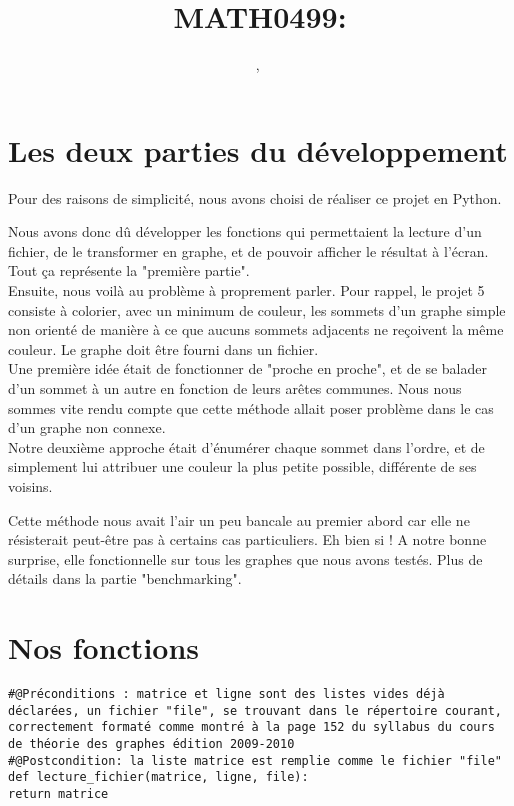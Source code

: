 \documentclass[a4paper, 11pt, oneside]{article}
\title{MATH0499: \intitule}
\author{ \PrenomUN~\textsc{\NomUN}, \PrenomDEUX~\textsc{\NomDEUX}}
\date{}
\newcommand{\tablemat}{~}
\renewcommand{\tablemat}{\tableofcontents}
\begin{document}
\maketitle
\newpage
\tablemat
\newpage



\section{Les deux parties du développement}

Pour des raisons de simplicité, nous avons choisi de réaliser ce projet en Python.

Nous avons donc dû développer les fonctions qui permettaient la lecture d'un fichier, de le transformer en graphe, et de pouvoir afficher le résultat à l'écran. Tout ça représente la "première partie".
\\
Ensuite, nous voilà au problème à proprement parler.
Pour rappel, le projet 5 consiste à  colorier, avec un minimum de couleur, les sommets d'un graphe simple non orienté de manière à ce que aucuns sommets adjacents ne reçoivent la même couleur. Le graphe doit être fourni dans un fichier.
\\


Une première idée était de fonctionner de "proche en proche", et de se balader d'un sommet à un autre en fonction de leurs arêtes communes.
Nous nous sommes vite rendu compte que cette méthode allait poser problème dans le cas d'un graphe non connexe.
\\

Notre deuxième approche était d'énumérer chaque sommet dans l'ordre, et de simplement lui attribuer une couleur la plus petite possible, différente de ses voisins.


Cette méthode nous avait l'air un peu bancale au premier abord car elle ne résisterait peut-être pas à certains cas particuliers.
Eh bien si ! A notre bonne surprise, elle fonctionnelle sur tous les graphes que nous avons testés. Plus de détails dans la partie "benchmarking".




\section{Nos fonctions}



\begin{lstlisting}[caption={lecture du fichier}]
#@Préconditions : matrice et ligne sont des listes vides déjà déclarées, un fichier "file", se trouvant dans le répertoire courant, correctement formaté comme montré à la page 152 du syllabus du cours de théorie des graphes édition 2009-2010
#@Postcondition: la liste matrice est remplie comme le fichier "file"
def lecture_fichier(matrice, ligne, file):
return matrice
\end{lstlisting}
\end{document}
